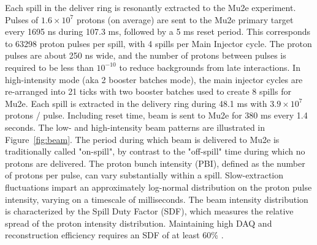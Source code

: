 Each spill in the deliver ring is resonantly extracted to the Mu2e experiment. Pulses of $1.6\times 10^{7}$ protons (on average) are sent to the Mu2e primary target every 1695 ns during 107.3 ms, followed by a 5 ms reset period. This corresponds to 63298 proton pulses per spill, with 4 spills per Main Injector cycle. The proton pulses are about 250 ns wide, and the number of protons between pulses is required to be less than $10^{-10}$ \cite{beamreqs} to reduce backgrounds from late interactions. In high-intensity mode (aka 2 booster batches mode), the main injector cycles are re-arranged into 21 ticks with two booster batches used to create 8 spills for Mu2e. Each spill is extracted in the delivery ring during 48.1 ms with $3.9\times 10^{7}$ protons / pulse. Including reset time, beam is sent to Mu2e for 380 ms every 1.4 seconds. The low- and high-intensity beam patterns are illustrated in Figure~\ref{fig:beam}. The period during which beam is delivered to Mu2e is traditionally called "on-spill", by contrast to the "off-spill" time during which no protons are delivered. The proton bunch intensity (PBI), defined as the number of protons per pulse, can vary substantially within a spill. Slow-extraction fluctuations impart an approximately log-normal distribution on the proton pulse intensity, varying on a timescale of milliseconds. The beam intensity distribution is characterized by the Spill Duty Factor (SDF), which measures the relative spread of the proton intensity distribution. Maintaining high DAQ and reconstruction efficiency requires an SDF of at least 60\% \cite{beamreqs}.

